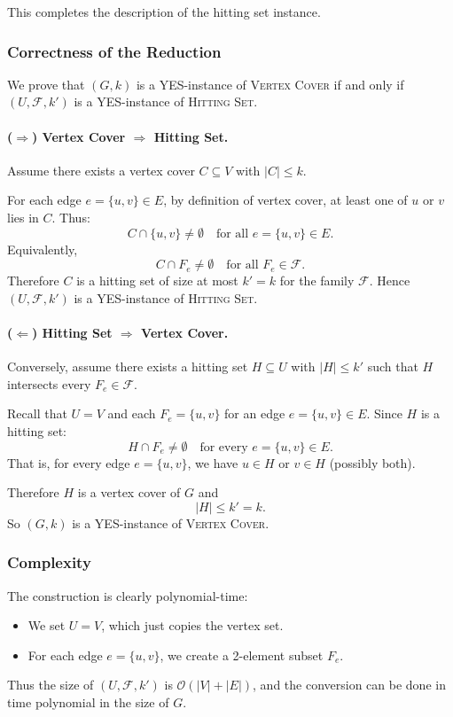 \documentclass[9pt]{extarticle}
\begin{document}
This completes the description of the hitting set instance.

\subsubsection*{Correctness of the Reduction}

We prove that $(G,k)$ is a YES-instance of \textsc{Vertex Cover} if and only if
$(U,\mathcal{F},k')$ is a YES-instance of \textsc{Hitting Set}.

\paragraph{($\Rightarrow$) Vertex Cover $\Rightarrow$ Hitting Set.}

Assume there exists a vertex cover $C \subseteq V$ with $|C| \le k$.

For each edge $e = \{u,v\} \in E$, by definition of vertex cover, at least one
of $u$ or $v$ lies in $C$.  Thus:
\[
    C \cap \{u,v\} \ne \emptyset
    \quad\text{for all } e = \{u,v\} \in E.
\]
Equivalently,
\[
    C \cap F_e \ne \emptyset \quad\text{for all } F_e \in \mathcal{F}.
\]
Therefore $C$ is a hitting set of size at most $k' = k$ for the family
$\mathcal{F}$.  Hence $(U,\mathcal{F},k')$ is a YES-instance of
\textsc{Hitting Set}.

\paragraph{($\Leftarrow$) Hitting Set $\Rightarrow$ Vertex Cover.}

Conversely, assume there exists a hitting set $H \subseteq U$ with
$|H| \le k'$ such that $H$ intersects every $F_e \in \mathcal{F}$.

Recall that $U = V$ and each $F_e = \{u,v\}$ for an edge $e=\{u,v\}\in E$.
Since $H$ is a hitting set:
\[
    H \cap F_e \ne \emptyset
    \quad\text{for every } e = \{u,v\} \in E.
\]
That is, for every edge $e = \{u,v\}$, we have $u \in H$ or $v \in H$ (possibly both).

Therefore $H$ is a vertex cover of $G$ and
\[
    |H| \le k' = k.
\]
So $(G,k)$ is a YES-instance of \textsc{Vertex Cover}.

\subsubsection*{Complexity}

The construction is clearly polynomial-time:
\begin{itemize}
    \item We set $U = V$, which just copies the vertex set.
    \item For each edge $e = \{u,v\}$, we create a 2-element subset $F_e$.
\end{itemize}
Thus the size of $(U,\mathcal{F},k')$ is $\mathcal{O}(|V| + |E|)$, and the
conversion can be done in time polynomial in the size of $G$.
\end{document}
